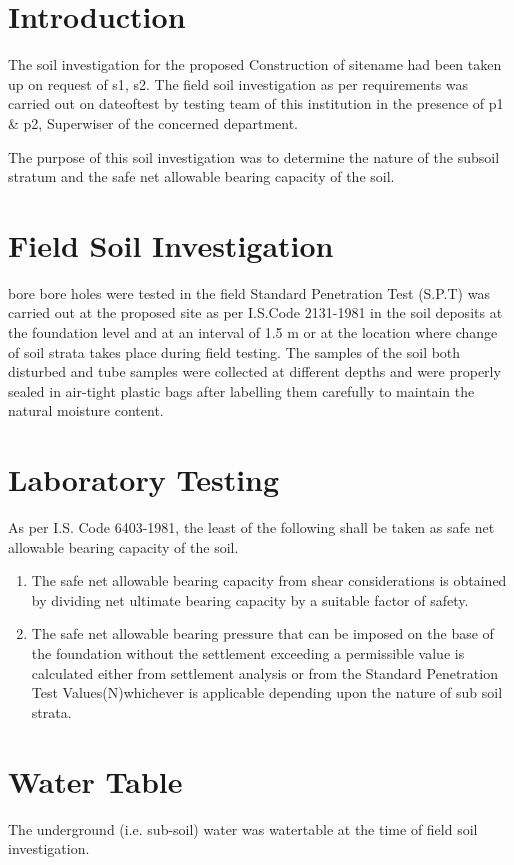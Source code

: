 \documentclass{soil12}
\begin{document}
\section{Introduction}
The soil investigation for the proposed Construction of {{sitename}} had been taken up on request of {{s1}}, {{s2}}. The field soil investigation as per requirements was carried out on {{dateoftest}} by testing team of this institution in the presence of {{p1}} \& {{p2}}, Superwiser of the concerned department.\par
The purpose of this soil investigation was to determine the nature of the subsoil stratum and the safe net
allowable bearing capacity of the soil.

\section{Field Soil Investigation}
{{bore}} bore holes were tested in the field Standard Penetration Test (S.P.T) was carried out at the proposed
site as per I.S.Code 2131-1981 in the soil deposits at the foundation level and at an interval of 1.5 m or at
the location where change of soil strata takes place during field testing. The samples of the soil both
disturbed and tube samples were collected at different depths and were properly sealed in air-tight plastic
bags after labelling them carefully to maintain the natural moisture content.
\section{Laboratory Testing}
As per I.S. Code 6403-1981, the least of the following shall be taken as safe net allowable bearing
capacity of the soil.
\begin{enumerate}
\item{The safe net allowable bearing capacity from shear considerations is obtained by dividing net
ultimate bearing capacity by a suitable factor of safety.}
\item{The safe net allowable bearing pressure that can be imposed on the base of the foundation
without the settlement exceeding a permissible value is calculated either from settlement
analysis or from the Standard Penetration Test Values(N)whichever is applicable depending
upon the nature of sub soil strata.}
\end{enumerate}
\section{Water Table}
The underground (i.e. sub-soil) water was {{watertable}}  at the time of field soil investigation.
\end{document}

